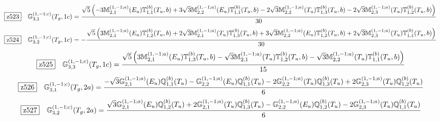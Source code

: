 \documentclass[fleqn,10pt,landscape]{jsarticle}
\begin{document}
\begin{dmath*}
\hspace*{3mm}\fbox{z523}\quad \mathbb{G}_{3,1}^{(1,-1;c)}(T_{g},1c)=\frac{\sqrt{5} \left(- 3 \mathbb{M}_{2,1}^{(1,-1;a)}(E_{u}) \mathbb{T}_{1,1}^{(b)}(T_{u},b) + 3 \sqrt{3} \mathbb{M}_{2,2}^{(1,-1;a)}(E_{u}) \mathbb{T}_{1,1}^{(b)}(T_{u},b) - 2 \sqrt{3} \mathbb{M}_{2,2}^{(1,-1;a)}(T_{u}) \mathbb{T}_{1,3}^{(b)}(T_{u},b) - 2 \sqrt{3} \mathbb{M}_{2,3}^{(1,-1;a)}(T_{u}) \mathbb{T}_{1,2}^{(b)}(T_{u},b)\right)}{30}
\end{dmath*}
\begin{dmath*}
\hspace*{3mm}\fbox{z524}\quad \mathbb{G}_{3,2}^{(1,-1;c)}(T_{g},1c)=- \frac{\sqrt{5} \left(3 \mathbb{M}_{2,1}^{(1,-1;a)}(E_{u}) \mathbb{T}_{1,2}^{(b)}(T_{u},b) + 2 \sqrt{3} \mathbb{M}_{2,1}^{(1,-1;a)}(T_{u}) \mathbb{T}_{1,3}^{(b)}(T_{u},b) + 3 \sqrt{3} \mathbb{M}_{2,2}^{(1,-1;a)}(E_{u}) \mathbb{T}_{1,2}^{(b)}(T_{u},b) + 2 \sqrt{3} \mathbb{M}_{2,3}^{(1,-1;a)}(T_{u}) \mathbb{T}_{1,1}^{(b)}(T_{u},b)\right)}{30}
\end{dmath*}
\begin{dmath*}
\hspace*{3mm}\fbox{z525}\quad \mathbb{G}_{3,3}^{(1,-1;c)}(T_{g},1c)=\frac{\sqrt{5} \left(3 \mathbb{M}_{2,1}^{(1,-1;a)}(E_{u}) \mathbb{T}_{1,3}^{(b)}(T_{u},b) - \sqrt{3} \mathbb{M}_{2,1}^{(1,-1;a)}(T_{u}) \mathbb{T}_{1,2}^{(b)}(T_{u},b) - \sqrt{3} \mathbb{M}_{2,2}^{(1,-1;a)}(T_{u}) \mathbb{T}_{1,1}^{(b)}(T_{u},b)\right)}{15}
\end{dmath*}
\begin{dmath*}
\hspace*{3mm}\fbox{z526}\quad \mathbb{G}_{3,1}^{(1,-1;c)}(T_{g},2a)=\frac{- \sqrt{3} \mathbb{G}_{2,1}^{(1,-1;a)}(E_{u}) \mathbb{Q}_{1,1}^{(b)}(T_{u}) - \mathbb{G}_{2,2}^{(1,-1;a)}(E_{u}) \mathbb{Q}_{1,1}^{(b)}(T_{u}) - 2 \mathbb{G}_{2,2}^{(1,-1;a)}(T_{u}) \mathbb{Q}_{1,3}^{(b)}(T_{u}) + 2 \mathbb{G}_{2,3}^{(1,-1;a)}(T_{u}) \mathbb{Q}_{1,2}^{(b)}(T_{u})}{6}
\end{dmath*}
\begin{dmath*}
\hspace*{3mm}\fbox{z527}\quad \mathbb{G}_{3,2}^{(1,-1;c)}(T_{g},2a)=\frac{\sqrt{3} \mathbb{G}_{2,1}^{(1,-1;a)}(E_{u}) \mathbb{Q}_{1,2}^{(b)}(T_{u}) + 2 \mathbb{G}_{2,1}^{(1,-1;a)}(T_{u}) \mathbb{Q}_{1,3}^{(b)}(T_{u}) - \mathbb{G}_{2,2}^{(1,-1;a)}(E_{u}) \mathbb{Q}_{1,2}^{(b)}(T_{u}) - 2 \mathbb{G}_{2,3}^{(1,-1;a)}(T_{u}) \mathbb{Q}_{1,1}^{(b)}(T_{u})}{6}
\end{dmath*}
\end{document}
